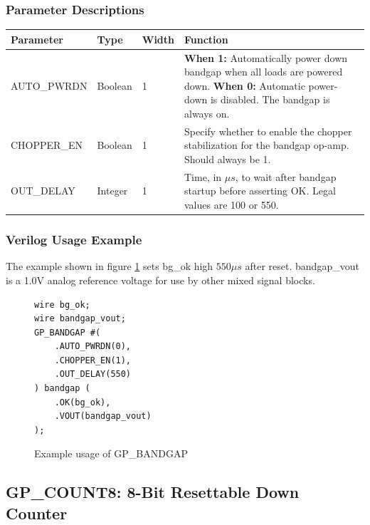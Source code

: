 \documentclass{article}
\begin{document}
\subsubsection{Parameter Descriptions}

\begin{tabularx}{5in}{|l|l|l|X|}
\hline
{\bfseries Parameter} & {\bfseries Type} & {\bfseries Width} & {\bfseries Function} \\
\hline
AUTO\_PWRDN & Boolean & 1 &
	{\bfseries When 1: } \newline Automatically power down bandgap when all loads are powered down. \newline
	{\bfseries When 0: } \newline Automatic power-down is disabled. The bandgap is always on.\\
\hline
CHOPPER\_EN & Boolean & 1 &
	Specify whether to enable the chopper stabilization for the bandgap op-amp. Should always be 1. \\
\hline
OUT\_DELAY & Integer & 1 &
	Time, in $\mu s$, to wait after bandgap startup before asserting OK. Legal values are 100 or 550.\\
\hline
\end{tabularx}

\subsubsection{Verilog Usage Example}

The example shown in figure \ref{gp-bandgap-example} sets bg\_ok high $550 \mu s$ after reset. bandgap\_vout is a 1.0V 
analog reference voltage for use by other mixed signal blocks.

\begin{figure}[h]
\begin{lstlisting}
wire bg_ok;
wire bandgap_vout;
GP_BANDGAP #(
	.AUTO_PWRDN(0),
	.CHOPPER_EN(1),
	.OUT_DELAY(550)
) bandgap (
	.OK(bg_ok),
	.VOUT(bandgap_vout)
);
\end{lstlisting}
\caption{Example usage of GP\_BANDGAP}
\label{gp-bandgap-example}
\end{figure}


\pagebreak
\subsection{GP\_COUNT8: 8-Bit Resettable Down Counter}
\end{document}

